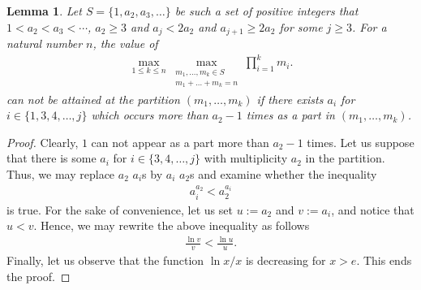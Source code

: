 \documentclass[12pt]{amsart}
\newtheorem{lemma}[theorem]{Lemma}
\theoremstyle{definition}
\theoremstyle{remark}
\numberwithin{theorem}{section} \numberwithin{equation}{section}
\begin{document}
\begin{lemma}\label{Lemma: a_2-1 is the max of occurrences}  
Let $S=\{1,a_2,a_3,\ldots\}$ be such a set of positive integers that $1<a_2<a_3<\cdots$, $a_2\geq3$ and $a_{j} < 2a_2$ and $a_{j+1}\geq2a_2$ for some $j\geq3$. For a natural number $n$, the value of
\begin{align*}
\max_{1\leq k\leq n}\max_{\substack{ m_1,\ldots,m_k\in S \\ m_{1}+\ldots +m_{k}=n}}\prod_{i=1}^km_i.
\end{align*}
can not be attained at the partition $(m_1,\ldots,m_k)$ if there exists $a_i$ for $i\in\{1,3,4,\ldots,j\}$ which occurs more than $a_2-1$ times as a part in $(m_1,\ldots,m_k)$.
\end{lemma}
\begin{proof}
Clearly, $1$ can not appear as a part more than $a_2-1$ times. Let us suppose
that there is some $a_i$ for $i\in\{3,4,\ldots,j\}$ with
multiplicity
$a_2$ in the partition. Thus, we may replace $a_2$ $a_i$s by $a_i$ $a_2$s and examine whether the inequality
\begin{align*}
a_i^{a_2}<a_2^{a_i}
\end{align*}
is true. For the sake of convenience, let us set $u:=a_2$ and $v:=a_i$, and notice that $u<v$. Hence, we may rewrite the above inequality as follows
\begin{align*}
\frac{\ln{v}}{v}<\frac{\ln{u}}{u}.
\end{align*} 
Finally, let us observe that the function $\ln{x}/x$ is decreasing for $x>e$. This ends the proof.
\end{proof}
\end{document}
